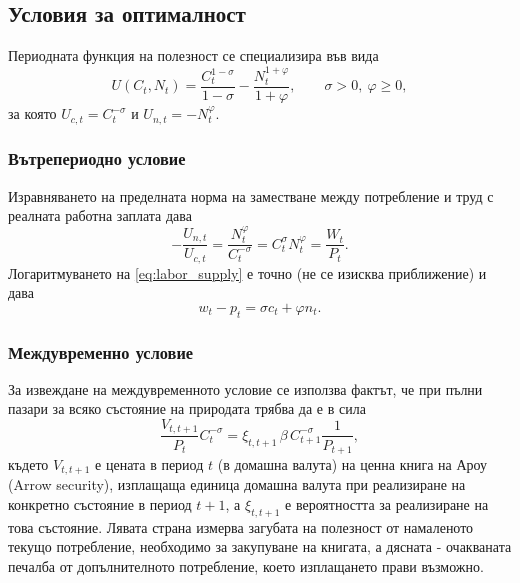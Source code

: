 \subsection{Условия за оптималност}

Периодната функция на полезност се специализира във вида
\begin{equation}
U(C_t, N_t) = \frac{C_t^{1-\sigma}}{1-\sigma} - \frac{N_t^{1+\varphi}}{1+\varphi},
\qquad \sigma > 0,\ \varphi \ge 0,
\label{eq:utility}
\end{equation}
за която $U_{c,t} = C_t^{-\sigma}$ и $U_{n,t} = -N_t^{\varphi}$.

\subsubsection*{Вътрепериодно условие}

Изравняването на пределната норма на заместване между потребление и труд с реалната работна заплата дава
\begin{equation}
-\frac{U_{n,t}}{U_{c,t}} = \frac{N_t^{\varphi}}{C_t^{-\sigma}} = C_t^{\sigma} N_t^{\varphi} = \frac{W_t}{P_t}.
\label{eq:labor_supply}
\end{equation}
Логаритмуването на \eqref{eq:labor_supply} е точно (не се изисква приближение) и дава
\begin{equation}
w_t - p_t = \sigma c_t + \varphi n_t.
\label{eq:labor_supply_log}
\end{equation}

\subsubsection*{Междувременно условие}

За извеждане на междувременното условие се използва фактът, че при пълни пазари за всяко състояние на природата трябва да е в сила
\begin{equation}
\frac{V_{t,t+1}}{P_t} C_t^{-\sigma} = \xi_{t,t+1}\, \beta\, C_{t+1}^{-\sigma} \frac{1}{P_{t+1}},
\label{eq:arrow}
\end{equation}
където $V_{t,t+1}$ е цената в период $t$ (в домашна валута) на ценна книга на Ароу (Arrow security), изплащаща единица домашна валута при реализиране на конкретно състояние в период $t+1$, а $\xi_{t,t+1}$ е вероятността за реализиране на това състояние. Лявата страна измерва загубата на полезност от намаленото текущо потребление, необходимо за закупуване на книгата, а дясната - очакваната печалба от допълнителното потребление, което изплащането прави възможно.

